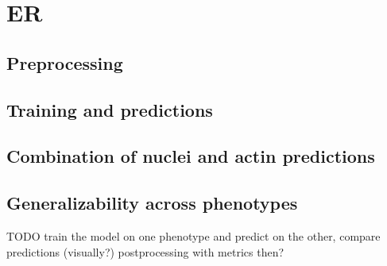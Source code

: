 \section{ER}
    \subsection{Preprocessing}
        
    \subsection{Training and predictions}
        
    \subsection{Combination of nuclei and actin predictions}
        
    \subsection{Generalizability across phenotypes}
        TODO train the model on one phenotype and predict on the other, compare predictions (visually?) 
        postprocessing with metrics then?
